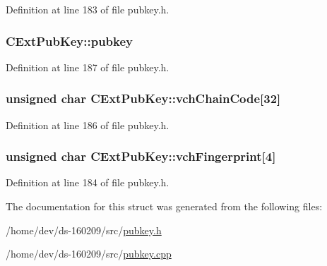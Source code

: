 Definition at line 183 of file pubkey.\+h.

\hypertarget{struct_c_ext_pub_key_ab18c8520919d20bbfd068565ae566ea8}{}
\subsubsection[{pubkey}]{ C\+Ext\+Pub\+Key\+::pubkey}\label{struct_c_ext_pub_key_ab18c8520919d20bbfd068565ae566ea8}


Definition at line 187 of file pubkey.\+h.

\hypertarget{struct_c_ext_pub_key_a208836888dcc295ca1510de459ca1fc7}{}
\subsubsection[{vch\+Chain\+Code}]{\setlength{\rightskip}{0pt plus 5cm}unsigned char C\+Ext\+Pub\+Key\+::vch\+Chain\+Code\mbox{[}32\mbox{]}}\label{struct_c_ext_pub_key_a208836888dcc295ca1510de459ca1fc7}


Definition at line 186 of file pubkey.\+h.

\hypertarget{struct_c_ext_pub_key_a57101a84d16d7897bcec224e488143d9}{}
\subsubsection[{vch\+Fingerprint}]{\setlength{\rightskip}{0pt plus 5cm}unsigned char C\+Ext\+Pub\+Key\+::vch\+Fingerprint\mbox{[}4\mbox{]}}\label{struct_c_ext_pub_key_a57101a84d16d7897bcec224e488143d9}


Definition at line 184 of file pubkey.\+h.



The documentation for this struct was generated from the following files\+:\begin{DoxyCompactItemize}
\item 
/home/dev/ds-\/160209/src/\hyperlink{pubkey_8h}{pubkey.\+h}\item 
/home/dev/ds-\/160209/src/\hyperlink{pubkey_8cpp}{pubkey.\+cpp}\end{DoxyCompactItemize}

